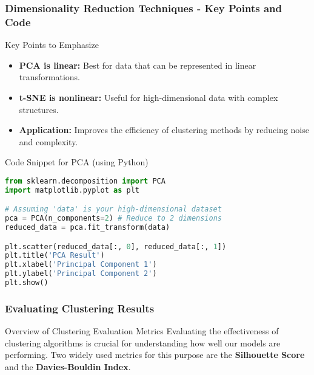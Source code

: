 \documentclass[aspectratio=169]{beamer}
\begin{document}
\begin{frame}[fragile]
    \frametitle{Dimensionality Reduction Techniques - Key Points and Code}
    \begin{block}{Key Points to Emphasize}
        \begin{itemize}
            \item \textbf{PCA is linear:} Best for data that can be represented in linear transformations.
            \item \textbf{t-SNE is nonlinear:} Useful for high-dimensional data with complex structures.
            \item \textbf{Application:} Improves the efficiency of clustering methods by reducing noise and complexity.
        \end{itemize}
    \end{block}
    
    \begin{block}{Code Snippet for PCA (using Python)}
    \begin{lstlisting}[language=Python]
from sklearn.decomposition import PCA
import matplotlib.pyplot as plt

# Assuming 'data' is your high-dimensional dataset
pca = PCA(n_components=2) # Reduce to 2 dimensions
reduced_data = pca.fit_transform(data)

plt.scatter(reduced_data[:, 0], reduced_data[:, 1])
plt.title('PCA Result')
plt.xlabel('Principal Component 1')
plt.ylabel('Principal Component 2')
plt.show()
    \end{lstlisting}
    \end{block}
\end{frame}

\begin{frame}[fragile]
    \frametitle{Evaluating Clustering Results}
    \begin{block}{Overview of Clustering Evaluation Metrics}
        Evaluating the effectiveness of clustering algorithms is crucial for understanding how well our models are performing. Two widely used metrics for this purpose are the \textbf{Silhouette Score} and the \textbf{Davies-Bouldin Index}.
    \end{block}
\end{frame}
\end{document}
